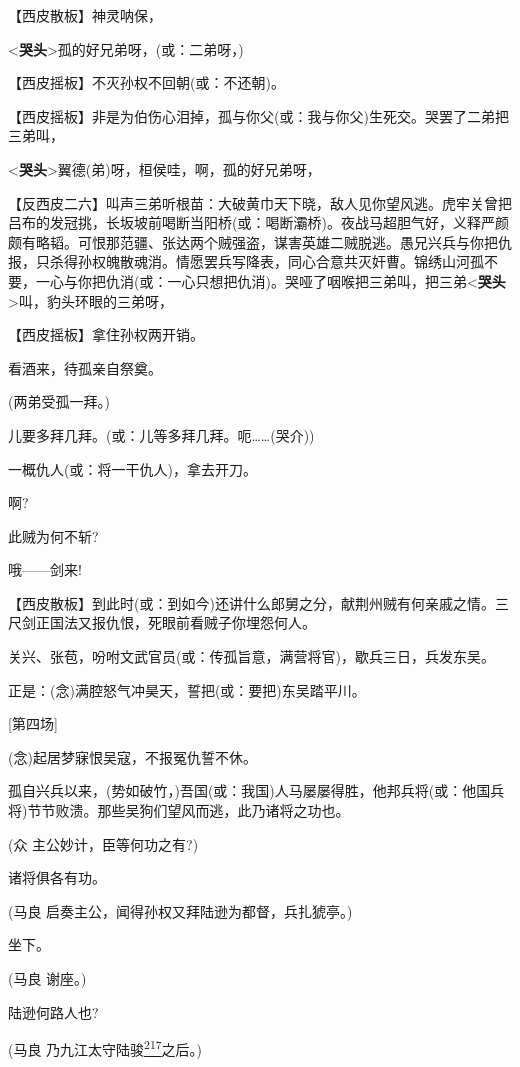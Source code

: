 【西皮散板】神灵呐保，

\textless{}\textbf{哭头}\textgreater{}孤的好兄弟呀，(或：二弟呀，)

【西皮摇板】不灭孙权不回朝(或：不还朝)。

【西皮摇板】非是为伯伤心泪掉，孤与你父(或：我与你父)生死交。哭罢了二弟把三弟叫，

\textless{}\textbf{哭头}\textgreater{}翼德(弟)呀，桓侯哇，啊，孤的好兄弟呀，

【反西皮二六】叫声三弟听根苗：大破黄巾天下晓，敌人见你望风逃。虎牢关曾把吕布的发冠挑，长坂坡前喝断当阳桥(或：喝断灞桥)。夜战马超胆气好，义释严颜颇有略韬。可恨那范疆、张达两个贼强盗，谋害英雄二贼脱逃。愚兄兴兵与你把仇报，只杀得孙权魄散魂消。情愿罢兵写降表，同心合意共灭奸曹。锦绣山河孤不要，一心与你把仇消(或：一心只想把仇消)。哭哑了咽喉把三弟叫，把三弟\textless{}\textbf{哭头}\textgreater{}叫，豹头环眼的三弟呀，

【西皮摇板】拿住孙权两开销。

看酒来，待孤亲自祭奠。

(两弟受孤一拜。)

儿要多拜几拜。(或：儿等多拜几拜。呃\ldots{}\ldots{}(哭介))

一概仇人(或：将一干仇人)，拿去开刀。

啊?

此贼为何不斩?

哦------剑来!

【西皮散板】到此时(或：到如今)还讲什么郎舅之分，献荆州贼有何亲戚之情。三尺剑正国法又报仇恨，死眼前看贼子你埋怨何人。

关兴、张苞，吩咐文武官员(或：传孤旨意，满营将官)，歇兵三日，兵发东吴。

正是：(念)满腔怒气冲昊天，誓把(或：要把)东吴踏平川。

{[}第四场{]}

(念)起居梦寐恨吴寇，不报冤仇誓不休。

孤自兴兵以来，(势如破竹，)吾国(或：我国)人马屡屡得胜，他邦兵将(或：他国兵将)节节败溃。那些吴狗们望风而逃，此乃诸将之功也。

(众 主公妙计，臣等何功之有?)

诸将俱各有功。

(马良 启奏主公，闻得孙权又拜陆逊为都督，兵扎猇亭。)

坐下。

(马良 谢座。)

陆逊何路人也?

(马良
乃九江太守陆骏\protect\hyperlink{fn217}{\textsuperscript{217}}之后。)

